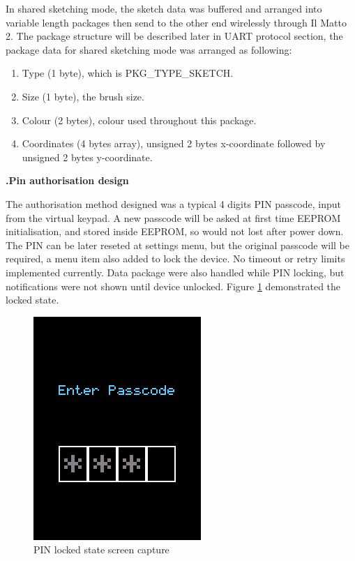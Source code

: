\documentclass[a4paper,notitlepage,10pt]{report}
\newcommand{\tab}{\hspace{0.75cm}}
\newcommand{\fontSubHeading}{\fontsize{10pt}{11pt}\selectfont}
\newcounter{sections}
\newcounter{subsections}[sections]
\begin{document}
\begin{multicols}{2}
In shared sketching mode, the sketch data was buffered and arranged into variable length packages then send to the other end wirelessly through Il Matto 2. The package structure will be described later in UART protocol section, the package data for shared sketching mode was arranged as following:

\begin{enumerate}[label={\arabic*)},align=left,leftmargin=0.5cm,labelwidth=!,topsep=0pt,partopsep=0pt,parsep=0pt,itemsep=0pt]
\item Type (1 byte), which is PKG\_TYPE\_SKETCH.
\item Size (1 byte), the brush size.
\item Colour (2 bytes), colour used throughout this package.
\item Coordinates (4 bytes array), unsigned 2 bytes x-coordinate followed by unsigned 2 bytes y-coordinate.
\end{enumerate}
\vspace{6pt}

\fontSubHeading
{}
\textbf{\thesections.\thesubsections\tab Pin authorisation design}
\vspace{6pt}

The authorisation method designed was a typical 4 digits PIN passcode, input from the virtual keypad. A new passcode will be asked at first time EEPROM initialisation, and stored inside EEPROM, so would not lost after power down. The PIN can be later reseted at settings menu, but the original passcode will be required, a menu item also added to lock the device. No timeout or retry limits implemented currently. Data package were also handled while PIN locking, but notifications were not shown until device unlocked. Figure \ref{fig:capPINLocked} demonstrated the locked state.
\vspace{6pt}

\begin{figure}[H]
	\centering
	\includegraphics[width=0.4\columnwidth]{cap_pin_locked}
	\caption{PIN locked state screen capture}
	\label{fig:capPINLocked}
\end{figure}
\vspace{6pt}


\end{multicols}
\end{document}
